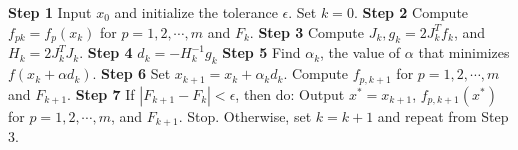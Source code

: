\begin{multicols}{3}
\textbf{Step 1} \newline
Input $x_0$ and initialize the tolerance $\epsilon$.  \newline
Set $k = 0$. \newline
\textbf{Step 2} \newline
Compute $f_{pk} = f_p(x_k)$ for $p = 1, 2, \cdots, m$ and $F_k$.
\newline
\textbf{Step 3}  \newline
Compute $J_k, g_k = 2J^T_k f_k$, and $H_k = 2J^T_k J_k$. \newline
\textbf{Step 4}  \newline
$d_k=-H_k^{-1}g_k$ \newline
\textbf{Step 5} \newline
Find $\alpha_k$, the value of $\alpha$ that minimizes $f(x_k + \alpha d_k)$. \newline
\textbf{Step 6} \newline
Set $x_{k+1} = x_k + \alpha_kd_k$. \newline
Compute $f_{p,k+1}$ for $p = 1, 2,\cdots, m$ and $F_{k+1}$. \newline
\textbf{Step 7} \newline
If $|F_{k+1}-F_k | < \epsilon$, then do: \newline
Output $x^*= x_{k+1}$, $f_{p,k+1}(x^*)$ for $p = 1, 2,\cdots, m$, and $F_{k+1}$. \newline
Stop. \newline
Otherwise, set $k = k + 1$ and repeat from Step 3.



\end{multicols}
